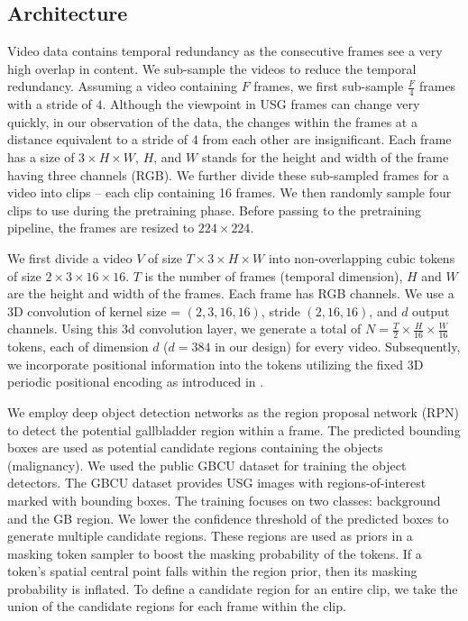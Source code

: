 \subsection{\focusmae Architecture}
%
\label{sec:method_subsample}
% 
Video data contains temporal redundancy as the consecutive frames see a very high overlap in content. We sub-sample the videos to reduce the temporal redundancy. Assuming a video containing $F$ frames, we first sub-sample $\frac{F}{4}$ frames with a stride of $4$. Although the viewpoint in USG frames can change very quickly, in our observation of the data, the changes within the frames at a distance equivalent to a stride of 4 from each other are insignificant. Each frame has a size of $3\times H\times W$, $H$, and $W$ stands for the height and width of the frame having three channels (RGB). We further divide these sub-sampled frames for a video into clips -- each clip containing 16 frames. We then randomly sample four clips to use during the pretraining phase. Before passing to the pretraining pipeline, the frames are resized to $224\times 224$.

% 
We first divide a video $V$ of size $T\times 3\times H\times W$ into non-overlapping cubic tokens of size $2\times 3 \times 16 \times 16$. $T$ is the number of frames (temporal dimension), $H$ and $W$ are the height and width of the frames. Each frame has RGB channels. We use a 3D convolution of kernel size = $(2, 3, 16, 16)$,  stride $(2, 16, 16)$, and $d$ output channels. Using this 3d convolution layer, we generate a total of $N=\frac{T}{2}\times\frac{H}{16}\times\frac{W}{16}$ tokens, each of dimension $d$ ($d=384$ in our design) for every video. 
Subsequently, we incorporate positional information into the tokens utilizing the fixed 3D periodic positional encoding as introduced in \cite{vaswani2017attention}.

%
We employ deep object detection networks as the region proposal network (RPN) to detect the potential gallbladder region within a frame. The predicted bounding boxes are used as potential candidate regions containing the objects (malignancy). We used the public GBCU \cite{basu2022surpassing} dataset for training the object detectors. The GBCU dataset provides USG images with regions-of-interest marked with bounding boxes. The training focuses on two classes: background and the GB region. We lower the confidence threshold of the predicted boxes to generate multiple candidate regions. These regions are used as priors in a masking token sampler to boost the masking probability of the tokens. If a token's spatial central point falls within the region prior, then its masking probability is inflated. To define a candidate region for an entire clip, we take the union of the candidate regions for each frame within the clip.

